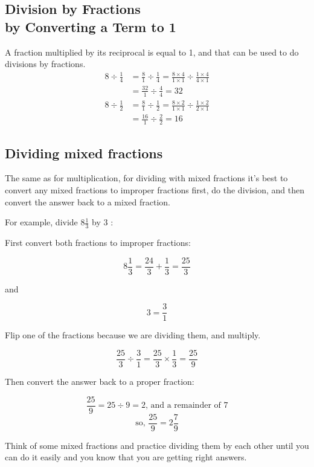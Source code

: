 \documentclass[16pt]{article}
\begin{document}
\begin{spacing}{1.25}
\subsection*{Division by Fractions\\by Converting a Term to 1}

A fraction multiplied by its reciprocal is equal to 1, and that can be used to do divisions by fractions.
\begin{align*}
8 \div \frac{1}{4} &= \frac{8}{1} \div \frac{1}{4}
                    = \frac{8 \times 4}{1 \times 1}
                      \div \frac{1 \times 4}{4 \times 1}\\
                   &= \frac{32}{1} \div \frac{4}{4} = 32
\end{align*}
\begin{align*}
8 \div \frac{1}{2} &= \frac{8}{1} \div \frac{1}{2}
                    = \frac{8 \times 2}{1 \times 1}
                      \div \frac{1 \times 2}{2 \times 1}\\
                   &= \frac{16}{1} \div \frac{2}{2} = 16
\end{align*}

\subsection*{Dividing mixed fractions}
The same as for multiplication, for dividing with mixed fractions it's best to convert any mixed fractions to improper fractions first, do the division, and then convert the answer back to a mixed fraction.

\vspace{28pt}
For example, divide $8 \frac{1}{3}$ by 3 :

First convert both fractions to improper fractions:

$$8\frac{1}{3} = \frac{24}{3} + \frac{1}{3} = \frac{25}{3}$$
\begin{center} and \end{center}
$$3 = \frac{3}{1}$$

Flip one of the fractions because we are dividing them, and multiply.

$$\frac{25}{3} \div \frac{3}{1} = \frac{25}{3} \times \frac{1}{3} = \frac{25}{9}$$

Then convert the answer back to a proper fraction:

$$\frac{25}{9} = 25 \div 9 = 2 \text{, and a remainder of 7}$$
$$\text{so, }\frac{25}{9} = 2\frac{7}{9}$$

\vspace{28pt}
Think of some mixed fractions and practice dividing them by each other until you can do it easily and you know that you are getting right answers.


\end{spacing}
\end{document}

